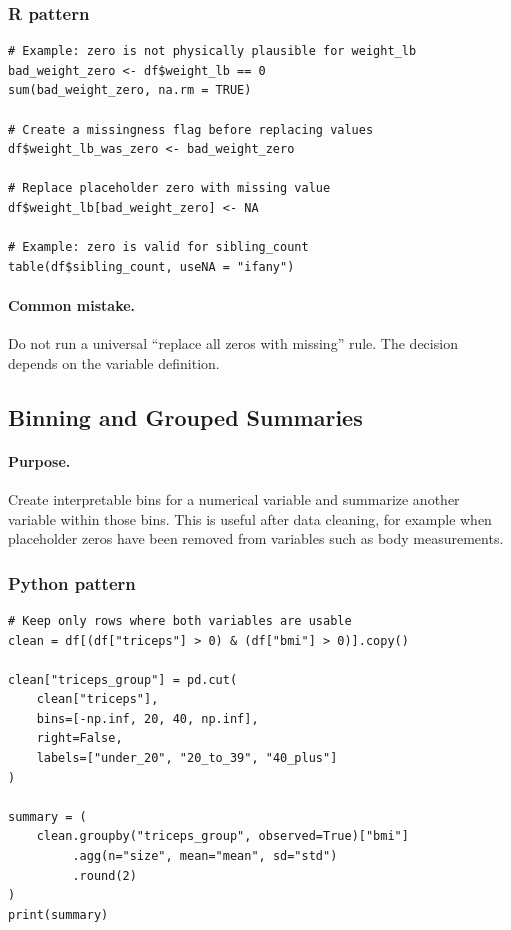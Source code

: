 \subsubsection*{R pattern}

\begin{verbatim}
# Example: zero is not physically plausible for weight_lb
bad_weight_zero <- df$weight_lb == 0
sum(bad_weight_zero, na.rm = TRUE)

# Create a missingness flag before replacing values
df$weight_lb_was_zero <- bad_weight_zero

# Replace placeholder zero with missing value
df$weight_lb[bad_weight_zero] <- NA

# Example: zero is valid for sibling_count
table(df$sibling_count, useNA = "ifany")
\end{verbatim}

\paragraph{Common mistake.} Do not run a universal ``replace all zeros with missing'' rule.  The decision depends on the variable definition.

\subsection{Binning and Grouped Summaries}
\label{app:ch03-software-cookbook-binning-grouped-summaries}

\paragraph{Purpose.} Create interpretable bins for a numerical variable and summarize another variable within those bins.  This is useful after data cleaning, for example when placeholder zeros have been removed from variables such as body measurements.

\subsubsection*{Python pattern}

\begin{verbatim}
# Keep only rows where both variables are usable
clean = df[(df["triceps"] > 0) & (df["bmi"] > 0)].copy()

clean["triceps_group"] = pd.cut(
    clean["triceps"],
    bins=[-np.inf, 20, 40, np.inf],
    right=False,
    labels=["under_20", "20_to_39", "40_plus"]
)

summary = (
    clean.groupby("triceps_group", observed=True)["bmi"]
         .agg(n="size", mean="mean", sd="std")
         .round(2)
)
print(summary)
\end{verbatim}

